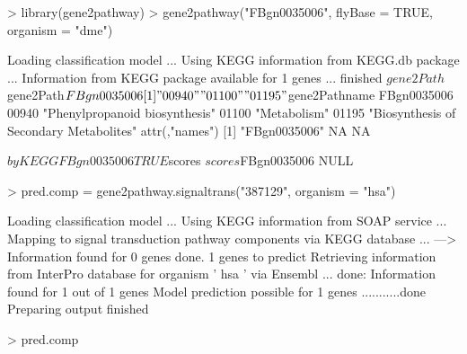 \documentclass[11pt,a4paper]{article}
\begin{document}
\begin{Schunk}
\begin{Sinput}
> library(gene2pathway)
> gene2pathway("FBgn0035006", flyBase = TRUE, organism = "dme")
\end{Sinput}
\begin{Soutput}
Loading classification model ...
Using KEGG information from KEGG.db package ...
Information from KEGG package available for  1  genes ...
finished
$gene2Path
$gene2Path$FBgn0035006
[1] "00940" "01100" "01195"


$gene2Pathname
      FBgn0035006                            
00940 "Phenylpropanoid biosynthesis"         
01100 "Metabolism"                           
01195 "Biosynthesis of Secondary Metabolites"
attr(,"names")
[1] "FBgn0035006" NA            NA           

$byKEGG
FBgn0035006 
       TRUE 

$scores
$scores$FBgn0035006
NULL
\end{Soutput}
\begin{Sinput}
> pred.comp = gene2pathway.signaltrans("387129", organism = "hsa")
\end{Sinput}
\begin{Soutput}
Loading classification model ...
Using KEGG information from SOAP service ...
Mapping to signal transduction pathway components via KEGG database ...
---> Information found for  0 genes
done.
1  genes to predict
Retrieving information from InterPro database for organism ' hsa ' via Ensembl ...
done: Information found for  1 out of  1  genes
Model prediction possible for  1  genes ...........done
Preparing output
finished
\end{Soutput}
\begin{Sinput}
> pred.comp
\end{Sinput}
\end{Schunk}
\begin{Schunk}
\end{Schunk}
\end{document}
